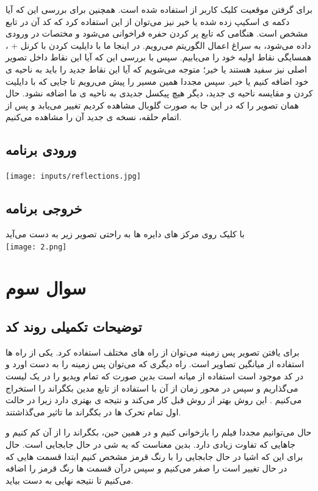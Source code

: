 \documentclass[12pt]{article}
\begin{document}
	برای گرفتن موقعیت کلیک کاربر از 
	استفاده شده است. همچنین برای بررسی این که آیا دکمه ی اسکیپ زده شده یا خیر نیز می‌توان از این استفاده کرد که کد آن در تابع 
مشخص است.
هنگامی که تابع پر کردن حفره فراخوانی می‌شود و مختصات در ورودی داده می‌شود، به سراغ اعمال الگوریتم می‌رویم. در اینجا ما با دایلیت کردن با کرنل + ، همسایگی نقاط اولیه خود را می‌یابیم. سپس با بررسی این که آیا این نقاط داخل تصویر اصلی نیز سفید هستند یا خیر؛ متوجه می‌شویم که آیا این نقاط جدید را باید به ناحیه ی خود اضافه ‌کنیم یا خیر. سپس مجددا همین مسیر را پیش می‌رویم تا جایی که با دایلیت کردن و مقایسه ناحیه ی جدید، دیگر هیچ پیکسل جدیدی به ناحیه ی ما اضافه نشود. حال همان تصویر را که در این جا به صورت گلوبال مشاهده کردیم تغییر می‌یابد و پس از اتمام حلقه، نسخه ی جدید آن را مشاهده می‌کنیم.
	
		\subsection{ورودی برنامه}
		\texttt{[image: inputs/reflections.jpg]}\\
		\subsection{خروجی برنامه}
		
	 با کلیک روی مرکز های دایره ها به راحتی تصویر زیر به دست می‌آید\\
		\texttt{[image: 2.png]}
		
		\newpage
		
		\section{سوال سوم }
		\subsection{توضیحات تکمیلی روند کد}
	برای یافتن تصویر پس زمینه می‌توان از راه های مختلف استفاده کرد. یکی از راه ها استفاده از میانگین تصاویر است. راه دیگری که می‌توان پس زمینه را به دست اورد و در کد موجود است استفاده از میانه است بدین صورت که تمام ویدیو را در یک لیست می‌گذاریم و سپس در محور زمان از آن با استفاده از تابع مدین بکگراند را استخراج می‌کنیم . این روش بهتر از روش قبل کار می‌کند و نتیجه ی بهتری دارد زیرا در حالت اول تمام تحرک ها در بکگراند ما تاثیر می‌گذاشتند. 

حال می‌توانیم مجددا فیلم را بازخوانی کنیم و در همین حین، بکگراند را از آن کم کنیم و جاهایی که تفاوت زیادی دارد. بدین معناست که یه شی در حال جابجایی است. حال برای این که اشیا در حال جابجایی را با رنگ قرمز مشخص کنیم ابتدا قسمت هایی که در حال تغییر است را صفر می‌کنیم و سپس درآن قسمت ها رنگ قرمز را اضافه می‌کنیم تا نتیجه نهایی به دست بیاید. 
\end{document}
